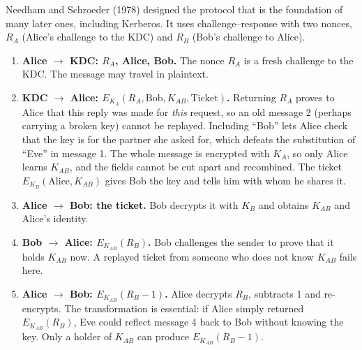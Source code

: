 Needham and Schroeder (1978) designed the protocol that is the foundation of many later ones, including Kerberos. It uses challenge--response with two nonces, $R_A$ (Alice's challenge to the KDC) and $R_B$ (Bob's challenge to Alice).
\begin{center}
\end{center}
\begin{enumerate}
  \item \textbf{Alice $\to$ KDC: $R_A$, Alice, Bob.} The nonce $R_A$ is a fresh challenge to the KDC. The message may travel in plaintext.
  \item \textbf{KDC $\to$ Alice: $E_{K_A}(R_A, \text{Bob}, K_{AB}, \text{Ticket})$.} Returning $R_A$ proves to Alice that this reply was made for \emph{this} request, so an old message 2 (perhaps carrying a broken key) cannot be replayed. Including ``Bob'' lets Alice check that the key is for the partner she asked for, which defeats the substitution of ``Eve'' in message 1. The whole message is encrypted with $K_A$, so only Alice learns $K_{AB}$, and the fields cannot be cut apart and recombined. The ticket $E_{K_B}(\text{Alice}, K_{AB})$ gives Bob the key and tells him with whom he shares it.
  \item \textbf{Alice $\to$ Bob: the ticket.} Bob decrypts it with $K_B$ and obtains $K_{AB}$ and Alice's identity.
  \item \textbf{Bob $\to$ Alice: $E_{K_{AB}}(R_B)$.} Bob challenges the sender to prove that it holds $K_{AB}$ now. A replayed ticket from someone who does not know $K_{AB}$ fails here.
  \item \textbf{Alice $\to$ Bob: $E_{K_{AB}}(R_B - 1)$.} Alice decrypts $R_B$, subtracts 1 and re-encrypts. The transformation is essential: if Alice simply returned $E_{K_{AB}}(R_B)$, Eve could reflect message 4 back to Bob without knowing the key. Only a holder of $K_{AB}$ can produce $E_{K_{AB}}(R_B - 1)$.
\end{enumerate}

